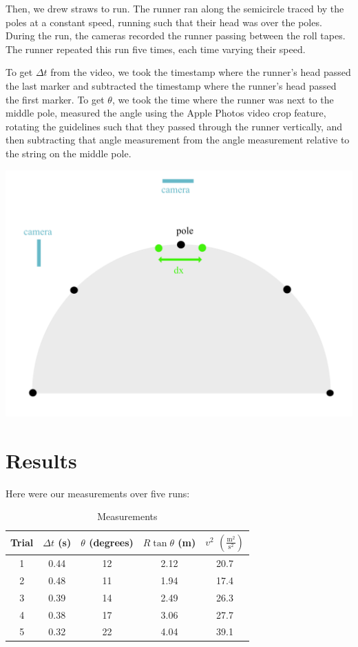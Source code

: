 \documentclass[12pt]{article}
\begin{document}
Then, we drew straws to run. The runner ran along the semicircle traced by the poles at a constant speed, running such that their head was over the poles. During the run, the cameras recorded the runner passing between the roll tapes. The runner repeated this run five times, each time varying their speed.

To get \(\Delta t\) from the video, we took the timestamp where the runner's head passed the last marker and subtracted the timestamp where the runner's head passed the first marker. To get \(\theta\), we took the time where the runner was next to the middle pole, measured the angle using the Apple Photos video crop feature, rotating the guidelines such that they passed through the runner vertically, and then subtracting that angle measurement from the angle measurement relative to the string on the middle pole.

\begin{center}
\includegraphics[width=5.5in]{./setup.png}
\end{center}
\section{Results}
\label{sec:org878aba9}

Here were our measurements over five runs:

\begin{table}[htbp]
\caption{\label{table:measurements}Measurements}
\centering
\begin{tabular}{c|c|c|c|c}
\hline
Trial & \(\Delta t\) (s) & \(\theta\) (degrees) & \(R\tan\theta\) (m) & \(v^2\) \((\frac{\text{m}^{2}}{\text{s}^{2}})\)\\
\hline
1 & 0.44 & 12 & 2.12 & 20.7\\
2 & 0.48 & 11 & 1.94 & 17.4\\
3 & 0.39 & 14 & 2.49 & 26.3\\
4 & 0.38 & 17 & 3.06 & 27.7\\
5 & 0.32 & 22 & 4.04 & 39.1\\
\end{tabular}
\end{table}
\end{document}
